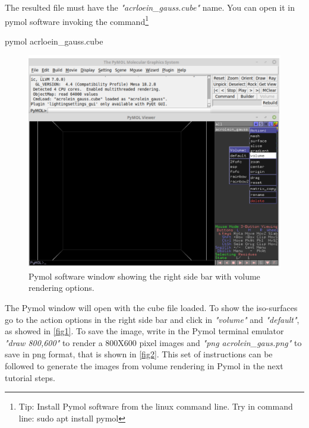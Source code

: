 \documentclass[a4paper,11pt]{refart}
\begin{document}
The resulted file must have the \emph{"acrloein\_gauss.cube"} name. 
You can open it in pymol software invoking the command\footnote{Tip: Install Pymol software from the linux command line. Try in command line: sudo apt install pymol}

\hspace*{-\leftmarginwidth}
\begin{minipage}{\fullwidth}
	\begin{commandshell}pymol acrloein_gauss.cube\end{commandshell}
\end{minipage}

\begin{figure}[H]
	\includegraphics[width=5in]{images_material/figure1}
	\caption{Pymol software window showing the right side bar with volume rendering options.}
	\label{fig1}
\end{figure}

The Pymol window will open with the cube file loaded. To show the iso-surfaces go to the action options in the right side bar and click in \emph{"volume"} and \emph{"default"}, as showed in \autoref{fig1}. To save the image, write in the Pymol terminal emulator   \emph{"draw 800,600"} to render a 800X600 pixel images and \emph{"png acrolein\_gaus.png"} to save in png format, that is shown in \autoref{fig2}. This set of instructions can be followed to generate the images from volume rendering in Pymol in the next tutorial steps. 
\end{document}

